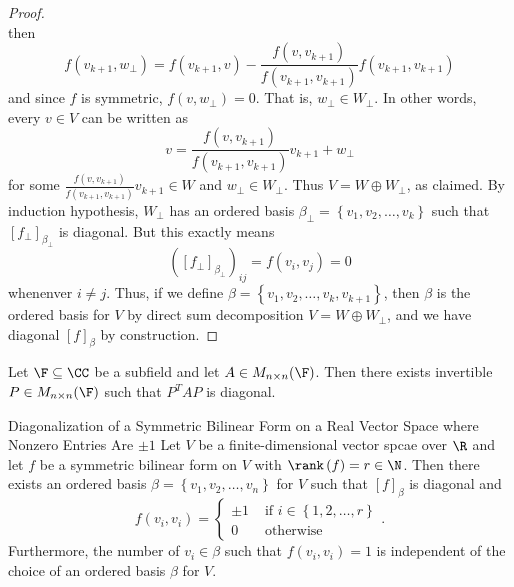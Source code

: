 \documentclass[linearalgebraII]{subfiles}
\begin{document}
\begin{proof}
\begin{equation*}
        \end{equation*}
        then
        \begin{equation*}
            f\left( v_{k+1}, w_\perp \right) = f\left( v_{k+1}, v \right) - \frac{f\left( v, v_{k+1} \right) }{f\left( v_{k+1},v_{k+1} \right) }f\left( v_{k+1},v_{k+1} \right) 
        \end{equation*}
        and since $f$ is symmetric, $f\left( v, w_\perp \right) = 0$. That is, $w_\perp\in W_\perp$. In other words, every $v\in V$ can be written as
        \begin{equation*}
            v = \frac{f\left( v, v_{k+1} \right) }{f\left( v_{k+1},v_{k+1} \right) }v_{k+1} + w_\perp
        \end{equation*}
        for some $\frac{f\left( v, v_{k+1} \right) }{f\left( v_{k+1},v_{k+1} \right) }v_{k+1}\in W$ and $w_\perp\in W_\perp$. Thus $V=W\oplus W_\perp$, as claimed. By induction hypothesis, $W_\perp$ has an ordered basis $\beta_\perp = \left\lbrace v_1,v_2,\ldots,v_k \right\rbrace $ such that $\left[ f_\perp \right] _{\beta_\perp}$ is diagonal. But this exactly means
        \begin{equation*}
            \left( \left[ f_\perp \right] _{\beta_\perp} \right) _{ij} = f\left( v_i,v_j \right) = 0
        \end{equation*}
        whenenver $i\neq j$. Thus, if we define $\beta = \left\lbrace v_1,v_2,\ldots,v_k,v_{k+1} \right\rbrace$, then $\beta$ is the ordered basis for $V$ by direct sum decomposition $V = W\oplus W_\perp$, and we have diagonal $\left[ f \right] _\beta$ by construction.
    \end{proof}

    \begin{cor}{}
        Let $\F\subseteq\CC$ be a subfield and let $A\in M_{n\times n}(\F)$. Then there exists invertible $P\in M_{n\times n}(\F)$ such that $P^TAP$ is diagonal.
    \end{cor}	

    \begin{theorem}{Diagonalization of a Symmetric Bilinear Form on a Real Vector Space where Nonzero Entries Are $\pm 1$}
        Let $V$ be a finite-dimensional vector spcae over $\R$ and let $f$ be a symmetric bilinear form on $V$ with $\rank\left( f \right) = r\in\N$. Then there exists an ordered basis $\beta=\left\lbrace v_1,v_2,\ldots,v_n \right\rbrace $ for $V$ such that $\left[ f \right] _\beta$ is diagonal and
        \begin{equation*}
            f\left( v_i,v_i \right) =
            \begin{cases} 
                \pm 1 & \text{ if } i\in\left\lbrace 1,2,\ldots,r \right\rbrace \\ 
                0 & \text{ otherwise }
            \end{cases}.
        \end{equation*}
        Furthermore, the number of $v_i\in\beta$ such that $f\left( v_i,v_i \right) = 1$ is independent of the choice of an ordered basis $\beta$ for $V$. 
    \end{theorem}
\end{document}
